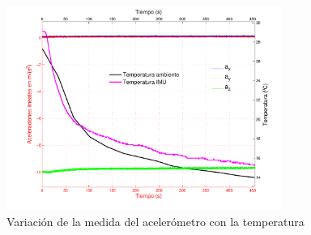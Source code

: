 \documentclass[spanish,12pt,a4paper,titlepage]{report}
\begin{document}
\begin{figure}[h!]
  \begin{center}
    \includegraphics[width=0.8\textwidth]{./pics/bajada.pdf}
  \end{center}
  \vspace{-20pt}
  \caption{Variación de la medida del acelerómetro con la temperatura }
  \label{fig:bajada}
\end{figure}
\end{document}
